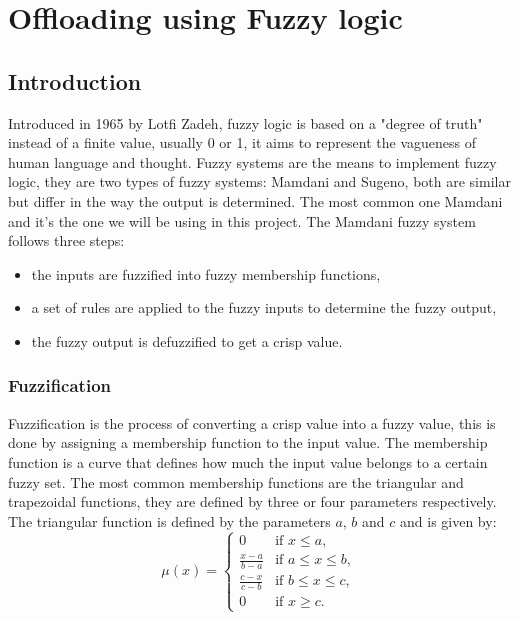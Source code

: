 \chapter{Offloading using Fuzzy logic}
\label{chap:fuzzy}

\section{Introduction}

Introduced in 1965 by Lotfi Zadeh\cite{zadeh-1965}, fuzzy logic is based on a "degree of truth" instead of a finite value, usually 0 or 1, it aims to
represent the vagueness of human language and thought. Fuzzy systems are the means to implement fuzzy logic, they are two types of fuzzy systems:
Mamdani and Sugeno, both are similar but differ in the way the output is determined. The most common one Mamdani and it's the one we will be using in
this project. The Mamdani fuzzy system follows three steps:
\begin{itemize}
	\item the inputs are fuzzified into fuzzy membership functions,
	\item a set of rules are applied to the fuzzy inputs to determine the fuzzy output,
	\item the fuzzy output is defuzzified to get a crisp value.
\end{itemize}

\subsection{Fuzzification}

Fuzzification is the process of converting a crisp value into a fuzzy value, this is done by assigning a membership function to the input value.
The membership function is a curve that defines how much the input value belongs to a certain fuzzy set. The most common membership functions are
the triangular and trapezoidal functions, they are defined by three or four parameters respectively. The triangular function is defined by the
parameters $a$, $b$ and $c$ and is given by:
\begin{equation}
	\mu(x) = \begin{cases}
		0                   & \text{if } x \leq a,        \\
		\frac{x - a}{b - a} & \text{if } a \leq x \leq b, \\
		\frac{c - x}{c - b} & \text{if } b \leq x \leq c, \\
		0                   & \text{if } x \geq c.
	\end{cases}
\end{equation}

